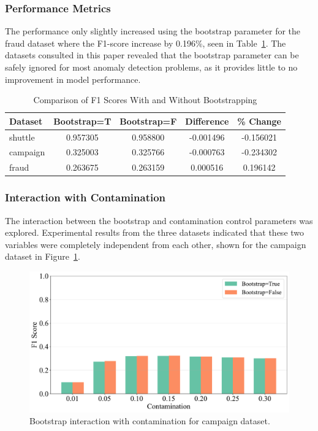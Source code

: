 \documentclass[10pt, conference]{IEEEtran}
\begin{document}
\subsubsection{Performance Metrics}
The performance only slightly increased using the bootstrap parameter for the fraud dataset where the F1-score  increase by 0.196\%, seen in Table~\ref{tab:bootstrap_comparison}. The datasets consulted in this paper revealed that the bootstrap parameter can be safely ignored for most anomaly detection problems, as it provides little to no improvement in model performance.
\begin{table}[htbp]
	\caption{Comparison of F1 Scores With and Without Bootstrapping}
	\centering
	\begin{tabular}{|l|c|c|c|c|}
		\hline
		\textbf{Dataset} & \textbf{Bootstrap=T} & \textbf{Bootstrap=F} & \textbf{Difference} & \textbf{\% Change} \\ 
		\hline
		shuttle & 0.957305 & 0.958800 & -0.001496 & -0.156021 \\ 
		\hline
		campaign & 0.325003 & 0.325766 & -0.000763 & -0.234302 \\ 
		\hline
		fraud & 0.263675 & 0.263159 & 0.000516 & 0.196142 \\ 
		\hline
	\end{tabular}
	\label{tab:bootstrap_comparison}
\end{table}



\subsubsection{Interaction with Contamination}

The interaction between the bootstrap and contamination control parameters was explored. Experimental results from the three datasets indicated that these two variables were completely independent from each other, shown for the campaign dataset in Figure~\ref{fig:bootstrap_int_campaign}. 


\begin{figure}[H]
	\centering
	\includegraphics[width=0.95\linewidth]{../results/campaign/bootstrap/bootstrap_contamination_interaction.pdf}
	\caption{Bootstrap interaction with contamination for campaign dataset.}
	\label{fig:bootstrap_int_campaign}
\end{figure}
\end{document}
